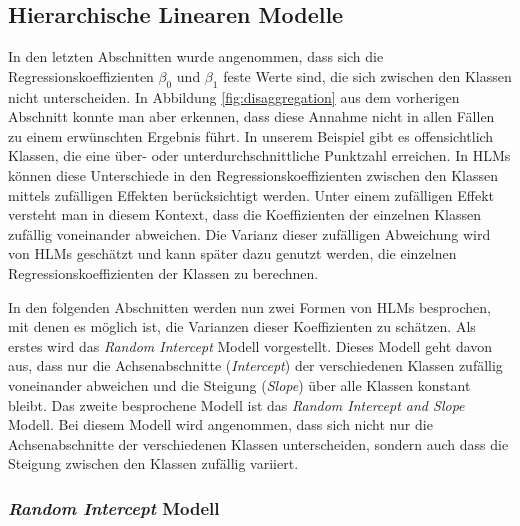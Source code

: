 \documentclass[12pt, a4paper]{article}\usepackage[]{graphicx}\usepackage[]{color}
\begin{document}
\subsection{Hierarchische Linearen Modelle}
In den letzten Abschnitten wurde angenommen, dass sich die Regressionskoeffizienten $\beta_0$ und $\beta_1$ feste Werte sind, die sich zwischen den Klassen nicht unterscheiden. In Abbildung \ref{fig:disaggregation} aus dem vorherigen Abschnitt konnte man aber erkennen, dass diese Annahme nicht in allen Fällen zu einem erwünschten Ergebnis führt. In unserem Beispiel gibt es offensichtlich Klassen, die eine über- oder unterdurchschnittliche Punktzahl erreichen. In HLMs können diese Unterschiede in den Regressionskoeffizienten zwischen den Klassen mittels zufälligen Effekten berücksichtigt werden. Unter einem zufälligen Effekt versteht man in diesem Kontext, dass die Koeffizienten der einzelnen Klassen zufällig voneinander abweichen. Die Varianz dieser zufälligen Abweichung wird von HLMs geschätzt und kann später dazu genutzt werden, die einzelnen Regressionskoeffizienten der Klassen zu berechnen.

In den folgenden Abschnitten werden nun zwei Formen von HLMs besprochen, mit denen es möglich ist, die Varianzen dieser Koeffizienten zu schätzen. Als erstes wird das \textit{Random Intercept} Modell vorgestellt. Dieses Modell geht davon aus, dass nur die Achsenabschnitte (\textit{Intercept}) der verschiedenen Klassen zufällig voneinander abweichen und die Steigung (\textit{Slope}) über alle Klassen konstant bleibt. Das zweite besprochene Modell ist das \textit{Random Intercept and Slope} Modell. Bei diesem Modell wird angenommen, dass sich nicht nur die Achsenabschnitte der verschiedenen Klassen unterscheiden, sondern auch dass die Steigung zwischen den Klassen zufällig variiert.

\subsubsection{\textit{Random Intercept} Modell} \label{section:random_intercept_model}
\end{document}
